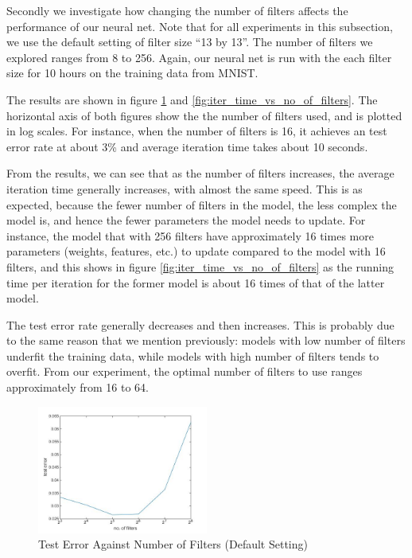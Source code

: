 \documentclass[10pt,twocolumn]{article}
\begin{document}
Secondly we investigate how changing the number of filters affects the performance of our neural net. Note that for all experiments in this subsection, we use the default setting of filter size ``13 by 13''. The number of filters we explored ranges from 8 to 256. Again, our neural net is run with the each filter size for 10 hours on the training data from MNIST.

The results are shown in figure \ref{fig:test_error_vs_no_of_filters} and \ref{fig:iter_time_vs_no_of_filters}. The horizontal axis of both figures show the the number of filters used, and is plotted in log scales. For instance, when the number of filters is 16, it achieves an test error rate at about 3\% and average iteration time takes about 10 seconds.

From the results, we can see that as the number of filters increases, the average iteration time generally increases, with almost the same speed. This is as expected, because the fewer number of filters in the model, the less complex the model is, and hence the fewer parameters the model needs to update. For instance, the model that with 256 filters have approximately 16 times more parameters (weights, features, etc.) to update compared to the model with 16 filters, and this shows in figure \ref{fig:iter_time_vs_no_of_filters} as the running time per iteration for the former model is about 16 times of that of the latter model.

The test error rate generally decreases and then increases. This is probably due to the same reason that we mention previously: models with low number of filters underfit the training data, while models with high number of filters tends to overfit. From our experiment, the optimal number of filters to use ranges approximately from 16 to 64.

\begin{figure}
\centering
\includegraphics[width = 0.5\textwidth]{figure/test_error_vs_no_of_filters}
\caption{Test Error Against Number of Filters (Default Setting)}
\label{fig:test_error_vs_no_of_filters}
\end{figure}
\end{document}
